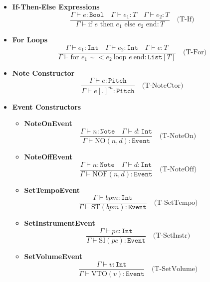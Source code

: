 \documentclass[letterpaper,12pt]{article}
\begin{document}
\begin{itemize}
    \item \textbf{If-Then-Else Expressions}
    \[
    \frac{
        \Gamma \vdash e : \texttt{Bool} \quad \Gamma \vdash e_1 : T \quad \Gamma \vdash e_2 : T
    }{
        \Gamma \vdash \text{if } e \text{ then } e_1 \text{ else } e_2 \text{ end} : T
    } \quad \text{(T-If)}
    \]
    
    \item \textbf{For Loops}
    \[
    \frac{
        \Gamma \vdash e_1 : \texttt{Int} \quad \Gamma \vdash e_2 : \texttt{Int} \quad \Gamma \vdash e : T
    }{
        \Gamma \vdash \text{for } e_1 \sim< e_2 \ \text{loop } e \ \text{end} : \texttt{List}[T]
    } \quad \text{(T-For)}
    \]
    
    \item \textbf{Note Constructor}
    \[
    \frac{
        \Gamma \vdash e : \texttt{Pitch}
    }{
        \Gamma \vdash e [.]^m : \texttt{Pitch}
    } \quad \text{(T-NoteCtor)}
    \]
    
    \item \textbf{Event Constructors}
    \begin{itemize}
        \item \textbf{NoteOnEvent}
        \[
        \frac{
            \Gamma \vdash n : \texttt{Note} \quad \Gamma \vdash d : \texttt{Int}
        }{
            \Gamma \vdash \text{NO}(n, d) : \texttt{Event}
        } \quad \text{(T-NoteOn)}
        \]
    
        \item \textbf{NoteOffEvent}
        \[
        \frac{
            \Gamma \vdash n : \texttt{Note} \quad \Gamma \vdash d : \texttt{Int}
        }{
            \Gamma \vdash \text{NOF}(n, d) : \texttt{Event}
        } \quad \text{(T-NoteOff)}
        \]
    
        \item \textbf{SetTempoEvent}
        \[
        \frac{
            \Gamma \vdash bpm : \texttt{Int}
        }{
            \Gamma \vdash \text{ST}(bpm) : \texttt{Event}
        } \quad \text{(T-SetTempo)}
        \]
    
        \item \textbf{SetInstrumentEvent}
        \[
        \frac{
            \Gamma \vdash pc : \texttt{Int}
        }{
            \Gamma \vdash \text{SI}(pc) : \texttt{Event}
        } \quad \text{(T-SetInstr)}
        \]
    
        \item \textbf{SetVolumeEvent}
        \[
        \frac{
            \Gamma \vdash v : \texttt{Int}
        }{
            \Gamma \vdash \text{VTO}(v) : \texttt{Event}
        } \quad \text{(T-SetVolume)}
        \]
    \end{itemize}
    

\end{itemize}
\end{document}
